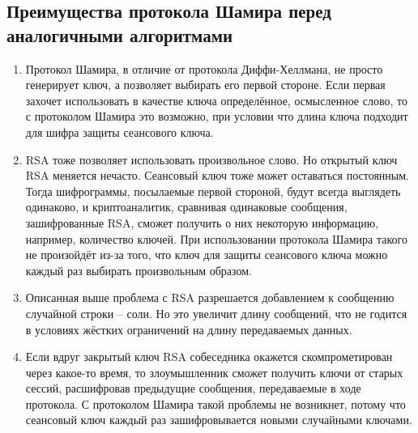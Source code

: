 \subsection{Преимущества протокола Шамира перед аналогичными алгоритмами}
\begin{enumerate}
	\item Протокол Шамира, в отличие от протокола Диффи-Хеллмана, не просто генерирует ключ, а позволяет выбирать его первой стороне. Если первая захочет использовать в качестве ключа определённое, осмысленное слово, то с протоколом Шамира это возможно, при условии что длина ключа подходит для шифра защиты сеансового ключа.
	\item RSA тоже позволяет использовать произвольное слово. Но открытый ключ RSA меняется нечасто. Сеансовый ключ тоже может оставаться постоянным. Тогда шифрограммы, посылаемые первой стороной, будут всегда выглядеть одинаково, и криптоаналитик, сравнивая одинаковые сообщения, зашифрованные RSA, сможет получить о них некоторую информацию, например, количество ключей. При использовании протокола Шамира такого не произойдёт из-за того, что ключ для защиты сеансового ключа можно каждый раз выбирать произвольным образом.
	\item Описанная выше проблема с RSA разрешается добавлением к сообщению случайной строки – соли. Но это увеличит длину сообщений, что не годится в условиях жёстких ограничений на длину передаваемых данных.
	\item Если вдруг закрытый ключ RSA собеседника окажется скомпрометирован через какое-то время, то злоумышленник сможет получить ключи от старых сессий, расшифровав предыдущие сообщения, передаваемые в ходе протокола. С протоколом Шамира такой проблемы не возникнет, потому что сеансовый ключ каждый раз зашифровывается новыми случайными ключами.
\end{enumerate}

